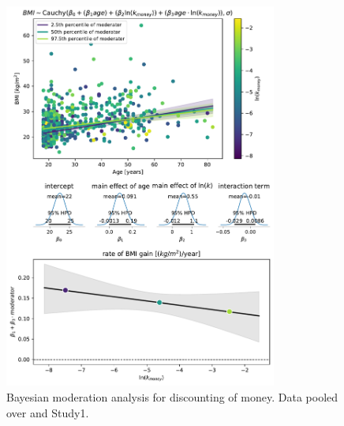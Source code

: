 \documentclass[12pt, a4paper]{article}
\begin{document}
\begin{figure} 
	\centering
	\includegraphics[width=0.8\textwidth]{meta_analysis/meta analysis bmi~age*money.pdf} 
	\caption{Bayesian moderation analysis for discounting of money. Data pooled over \cite{VeillardVincent2020} and Study1.}
	\label{fig:meta_money}
\end{figure}
\end{document}
